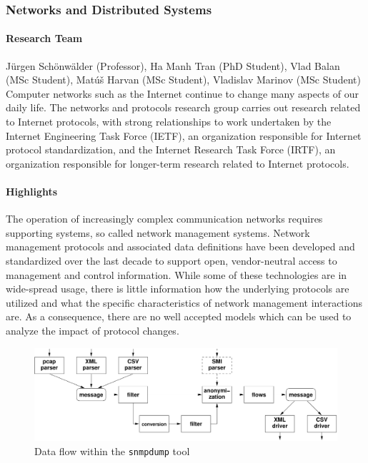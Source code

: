 
\subsubsection{Networks and
Distributed Systems}\label{ict:cns:schoenwaelder} 

\paragraph{Research Team}
J\"urgen Sch\"onw\"alder (Professor), Ha Manh Tran (PhD Student), Vlad Balan (MSc
Student), Mat\'u\v{s} Harvan (MSc Student), Vladislav Marinov (MSc Student)\\

Computer networks such as the Internet continue to change many aspects
of our daily life. The networks and protocols research group carries
out research related to Internet protocols, with strong relationships
to work undertaken by the Internet Engineering Task Force (IETF), an
organization responsible for Internet protocol standardization, and
the Internet Research Task Force (IRTF), an organization responsible
for longer-term research related to Internet protocols.

\paragraph{Highlights}

The operation of increasingly complex communication networks requires
supporting systems, so called network management systems.  Network
management protocols and associated data definitions have been
developed and standardized over the last decade to support open,
vendor-neutral access to management and control information.  While
some of these technologies are in wide-spread usage, there is little
information how the underlying protocols are utilized and what the
specific characteristics of network management interactions are. As a
consequence, there are no well accepted models which can be used to
analyze the impact of protocol changes.

\begin{figure}[ht]
  \begin{center}
     \includegraphics[width=\hsize]{schoenwaelder-tools}
  \end{center}
  \caption{Data flow within the \texttt{snmpdump} tool}\label{fig:snmpdump}
\end{figure}

